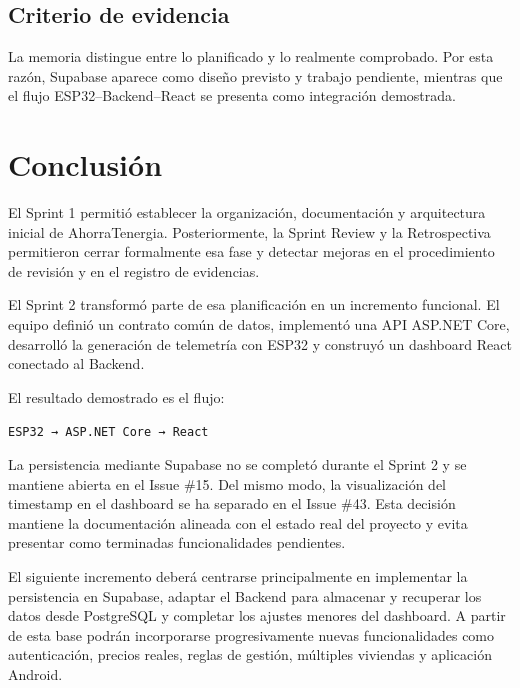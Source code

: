 \documentclass[11pt,a4paper,oneside]{report}
\begin{document}
\section{Criterio de evidencia}

La memoria distingue entre lo planificado y lo realmente comprobado. Por esta razón, Supabase aparece como diseño previsto y trabajo pendiente, mientras que el flujo ESP32--Backend--React se presenta como integración demostrada.


\chapter*{Conclusión}

El Sprint 1 permitió establecer la organización, documentación y arquitectura inicial de AhorraTenergia. Posteriormente, la Sprint Review y la Retrospectiva permitieron cerrar formalmente esa fase y detectar mejoras en el procedimiento de revisión y en el registro de evidencias.

El Sprint 2 transformó parte de esa planificación en un incremento funcional. El equipo definió un contrato común de datos, implementó una API ASP.NET Core, desarrolló la generación de telemetría con ESP32 y construyó un dashboard React conectado al Backend.

El resultado demostrado es el flujo:

\begin{center}
\texttt{ESP32 → ASP.NET Core → React}
\end{center}

La persistencia mediante Supabase no se completó durante el Sprint 2 y se mantiene abierta en el Issue \#15. Del mismo modo, la visualización del timestamp en el dashboard se ha separado en el Issue \#43. Esta decisión mantiene la documentación alineada con el estado real del proyecto y evita presentar como terminadas funcionalidades pendientes.

El siguiente incremento deberá centrarse principalmente en implementar la persistencia en Supabase, adaptar el Backend para almacenar y recuperar los datos desde PostgreSQL y completar los ajustes menores del dashboard. A partir de esta base podrán incorporarse progresivamente nuevas funcionalidades como autenticación, precios reales, reglas de gestión, múltiples viviendas y aplicación Android.
\end{document}
